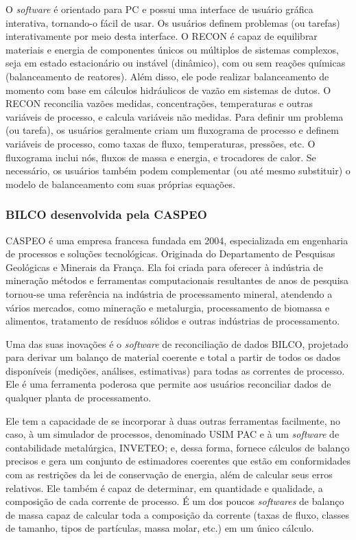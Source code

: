 O \textit{software} é orientado para PC e possui uma interface de usuário gráfica interativa, tornando-o fácil de usar. Os usuários definem problemas (ou tarefas) interativamente por meio desta interface. O RECON é capaz de equilibrar materiais e energia de componentes únicos ou múltiplos de sistemas complexos, seja em estado estacionário ou instável (dinâmico), com ou sem reações químicas (balanceamento de reatores). Além disso, ele pode realizar balanceamento de momento com base em cálculos hidráulicos de vazão em sistemas de dutos. O RECON reconcilia vazões medidas, concentrações, temperaturas e outras variáveis de processo, e calcula variáveis não medidas. Para definir um problema (ou tarefa), os usuários geralmente criam um fluxograma de processo e definem variáveis de processo, como taxas de fluxo, temperaturas, pressões, etc. O fluxograma inclui nós, fluxos de massa e energia, e trocadores de calor. Se necessário, os usuários também podem complementar (ou até mesmo substituir) o modelo de balanceamento com suas próprias equações.

\subsubsection{BILCO desenvolvida pela CASPEO}

CASPEO é uma empresa francesa fundada em 2004, especializada em engenharia de processos e soluções tecnológicas. Originada do 
Departamento de Pesquisas Geológicas e Minerais da França. Ela foi criada para oferecer à indústria de mineração métodos e ferramentas computacionais resultantes de anos de pesquisa tornou-se uma referência na indústria de processamento mineral, atendendo a vários mercados, como mineração e metalurgia, processamento de biomassa e alimentos, tratamento de resíduos sólidos e outras indústrias de processamento. 

Uma das suas inovações é o \textit{software} de reconciliação de dados BILCO, projetado para derivar um balanço de material coerente e total a partir de todos os dados disponíveis (medições, análises, estimativas) para todas as correntes de processo. Ele é uma ferramenta poderosa que permite aos usuários reconciliar dados de qualquer planta de processamento.

Ele tem a capacidade de se incorporar à duas outras ferramentas facilmente, no caso, à um simulador de processos, denominado USIM PAC e à um \textit{software} de contabilidade metalúrgica, INVETEO; e, dessa forma, fornece cálculos de balanço precisos e gera um conjunto de estimadores coerentes que estão em conformidades com as restrições da lei de conservação de energia, além de calcular seus erros relativos. Ele também é capaz de determinar, em quantidade e qualidade, a composição de cada corrente de processo. É um dos poucos \textit{softwares} de balanço de massa capaz de calcular toda a composição da corrente (taxas de fluxo, classes de tamanho, tipos de partículas, massa molar, etc.) em um único cálculo.


